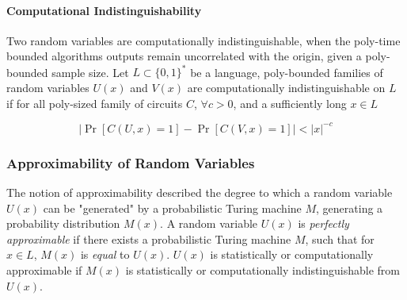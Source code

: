 %
%
%
%
%
%

\paragraph{Computational Indistinguishability} %
Two random variables are computationally indistinguishable, when the poly-time bounded algorithms outputs remain uncorrelated with the origin, given a poly-bounded sample size.
\bigskip
\newline
Let $L \subset \{0,1\}^*$ be a language, poly-bounded families of random variables $U(x)$ and $V(x)$ are computationally indistinguishable on $L$ if for all poly-sized family of circuits $C$, $\forall c > 0$, and a sufficiently long $x \in L$

$$|\Pr[C(U, x) = 1] - \Pr[C(V, x) = 1]|  < |x|^{-c}$$


%
%
%
%
%

\subsubsection{Approximability of Random Variables}%

The notion of approximability described the degree to which a random variable $U(x)$ can be "generated" by a probabilistic Turing machine $M$, generating a probability distribution $M(x)$.
\bigskip
\newline
A random variable $U(x)$ is \textit{perfectly approximable} if there exists a probabilistic Turing machine $M$, such that for $x \in L$, $M(x)$ is \textit{equal} to $U(x)$.
\newline
$U(x)$ is statistically or computationally approximable if $M(x)$ is statistically or computationally indistinguishable from $U(x)$.

